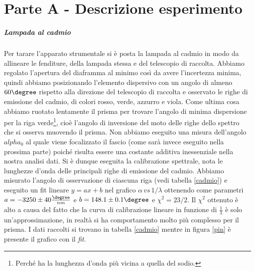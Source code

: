 \documentclass[10pt,a4paper]{article}
\begin{document}
\section{Parte A - Descrizione esperimento}
\subparagraph{Lampada al cadmio}
Per tarare l'apparato strumentale si è posta la lampada al cadmio in modo da allineare le fenditure, della lampada stessa e del telescopio di raccolta. Abbiamo regolato l'apertura del diaframma al minimo così da avere l'incertezza minima, quindi abbiamo posizionando l'elemento dispersivo con un angolo di almeno $60\degree$ rispetto alla direzione del telescopio di raccolta e osservato le righe di emissione del cadmio, di colori rosso, verde, azzurro e viola. Come ultima cosa abbiamo ruotato lentamente il prisma per trovare l'angolo di minima dispersione per la riga verde\footnote{Perché ha la lunghezza d'onda più vicina a quella del sodio.}, cioè l'angolo di inversione del moto delle righe dello spettro che si osserva muovendo il prisma. Non abbiamo eseguito una misura dell'angolo $alpha_0$ al quale viene focalizzato il fascio (come sarà invece eseguito nella prossima parte) poiché risulta essere una costante additiva inessenziale nella nostra analisi dati.
Si è dunque eseguita la calibrazione spettrale, nota le lunghezze d'onda delle principali righe di emissione del cadmio. Abbiamo misurato l'angolo di osservazione di ciascuna riga (vedi tabella \ref{cadmio}) e eseguito un fit lineare $y=ax+b$ nel grafico $\alpha\, \textit{vs}\, 1/\lambda$ ottenendo come parametri $a = -3250 \pm 40 \frac{\degree}{nm}$ e $ b = 148.1 \pm 0.1 \degree$ e $\chi^2=23/2$. Il $\chi^2$ ottenuto è alto a causa del fatto che la curva di calibrazione lineare in funzione di $\frac{1}{\lambda}$ è solo un'approssimazione, in realtà si ha comportamento molto più complesso per il prisma. I dati raccolti si trovano in tabella \ref{cadmio} mentre in figura \ref{pin} è presente il grafico con il \emph{fit}.
\end{document}
